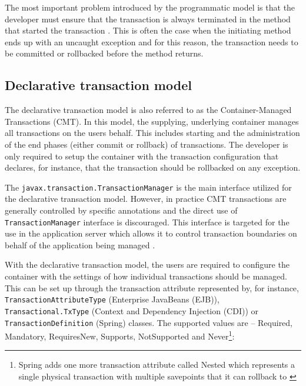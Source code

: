\documentclass[oneside,
  digital, %
  table,   %
  lof,     %
  lot,     %
]{fithesis3}
\begin{document}
The most important problem introduced by the programmatic model is that the developer must ensure that the transaction is always terminated in the method that started the transaction \cite{java_transaction_design_strategies}. This is often the case when  the initiating method ends up with an uncaught exception and for this reason, the transaction needs to be committed or rollbacked before the method returns.

\subsection{Declarative transaction model}
\label{sec:decl-tran-model}

The declarative transaction model is also referred to as the Container-Managed Transactions (CMT). In this model, the supplying, underlying container manages all transactions on the users behalf. This includes starting and the administration of the end phases (either commit or rollback) of transactions. The developer is only required to setup the container with the transaction configuration that declares, for instance, that the transaction should be rollbacked on any exception.

The \texttt{javax.transaction.TransactionManager} is the main interface utilized for the declarative transaction model. However, in practice CMT transactions are generally controlled by specific annotations and the direct use of \texttt{TransactionManager} interface is discouraged. This interface is targeted for the use in the application server which allows it to control transaction boundaries on behalf of the application being managed \cite{jta}.

With the declarative transaction model, the users are required to configure the container with the settings of how individual transactions should be managed. This can be set up through the transaction attribute represented by, for instance, \texttt{TransactionAttributeType} (Enterprise JavaBeans (EJB)), \texttt{Transactional.TxType} (Context and Dependency Injection (CDI)) or \texttt{TransactionDefinition} (Spring) classes. The supported values are -- Required, Mandatory, RequiresNew, Supports, NotSupported and Never\footnote{Spring adds one more transaction attribute called Nested which represents a single physical transaction with multiple savepoints that it can rollback to \cite{spring_transaction_management_documentation}}:
\end{document}
